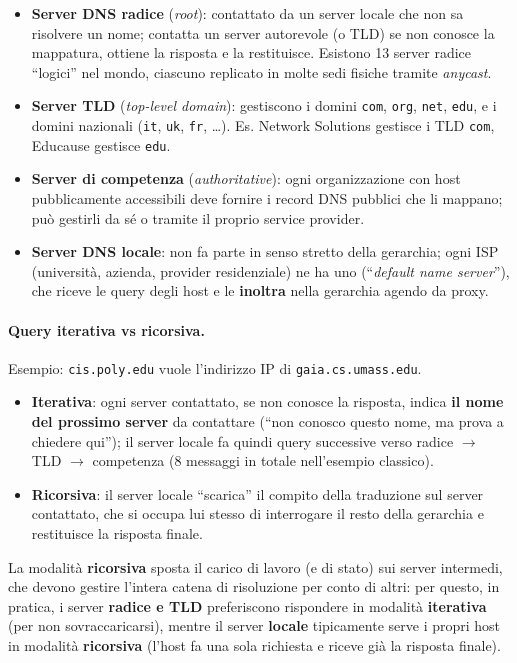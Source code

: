 \documentclass[12pt, a4paper]{article}
\begin{document}
\begin{itemize}
    \item \textbf{Server DNS radice} (\textit{root}): contattato da un server locale che non sa risolvere un nome; contatta un server autorevole (o TLD) se non conosce la mappatura, ottiene la risposta e la restituisce. Esistono 13 server radice ``logici'' nel mondo, ciascuno replicato in molte sedi fisiche tramite \textit{anycast}.
    \item \textbf{Server TLD} (\textit{top-level domain}): gestiscono i domini \texttt{com}, \texttt{org}, \texttt{net}, \texttt{edu}, e i domini nazionali (\texttt{it}, \texttt{uk}, \texttt{fr}, \dots). Es. Network Solutions gestisce i TLD \texttt{com}, Educause gestisce \texttt{edu}.
    \item \textbf{Server di competenza} (\textit{authoritative}): ogni organizzazione con host pubblicamente accessibili deve fornire i record DNS pubblici che li mappano; può gestirli da sé o tramite il proprio service provider.
    \item \textbf{Server DNS locale}: non fa parte in senso stretto della gerarchia; ogni ISP (università, azienda, provider residenziale) ne ha uno (``\textit{default name server}''), che riceve le query degli host e le \textbf{inoltra} nella gerarchia agendo da proxy.
\end{itemize}

\paragraph{Query iterativa vs ricorsiva.} Esempio: \texttt{cis.poly.edu} vuole l'indirizzo IP di \texttt{gaia.cs.umass.edu}.
\begin{itemize}
    \item \textbf{Iterativa}: ogni server contattato, se non conosce la risposta, indica \textbf{il nome del prossimo server} da contattare (``non conosco questo nome, ma prova a chiedere qui''); il server locale fa quindi query successive verso radice $\to$ TLD $\to$ competenza (8 messaggi in totale nell'esempio classico).
    \item \textbf{Ricorsiva}: il server locale ``scarica'' il compito della traduzione sul server contattato, che si occupa lui stesso di interrogare il resto della gerarchia e restituisce la risposta finale.
\end{itemize}

\begin{tcolorbox}[colback=cyan!5, colframe=blue!40!black, title=\textbf{Spunto per l'orale -- iterativa o ricorsiva, quale conviene?}]
La modalità \textbf{ricorsiva} sposta il carico di lavoro (e di stato) sui server intermedi, che devono gestire l'intera catena di risoluzione per conto di altri: per questo, in pratica, i server \textbf{radice e TLD} preferiscono rispondere in modalità \textbf{iterativa} (per non sovraccaricarsi), mentre il server \textbf{locale} tipicamente serve i propri host in modalità \textbf{ricorsiva} (l'host fa una sola richiesta e riceve già la risposta finale).
\end{tcolorbox}
\end{document}
